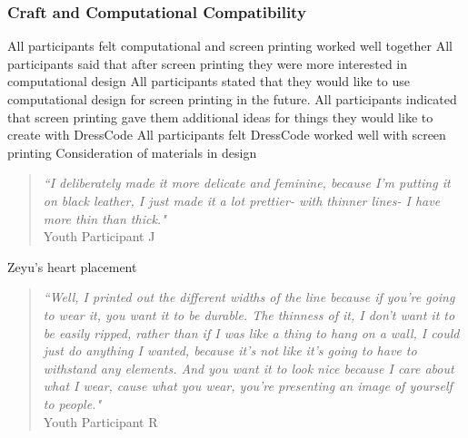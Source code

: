\documentclass{sigchi}
\begin{document}
\subsubsection{Craft and Computational Compatibility}
All participants felt computational and screen printing worked well together
All participants said that after screen printing they were more interested in computational design
All participants stated that they would like to use computational design for screen printing in the future.
All participants indicated that screen printing gave them additional ideas for things they would like to create with DressCode
All participants felt DressCode worked well with screen printing
Consideration of materials in design
\begin{quotation}
\textit{``I deliberately made it more delicate and feminine, because I'm putting it on black leather, I just made it a lot prettier- with thinner lines- I have more thin than thick."}
\\Youth Participant J
\end{quotation}
Zeyu's heart placement
\begin{quotation}
\textit{``Well, I printed out the different widths of the line because if you're going to wear it, you want it to be durable. The thinness of it, I don't want it to be easily ripped, rather than if I was like a thing to hang on a wall, I could just do anything I wanted, because it's not like it's going to have to withstand any elements. And you want it to look nice because I care about what I wear, cause what you wear, you're presenting an image of yourself to people."}
\\Youth Participant R
\end{quotation}
\end{document}
